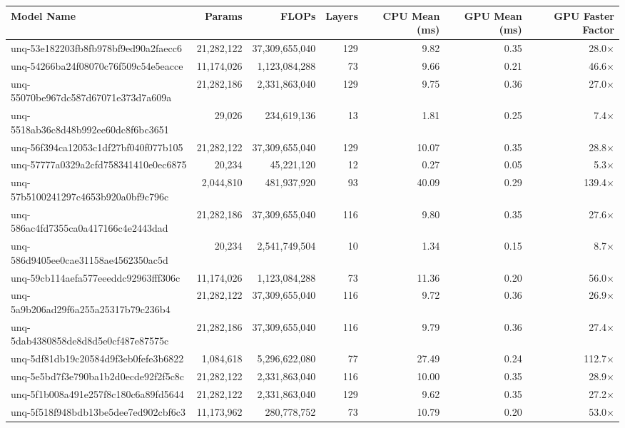 \begin{table}[h!]
\centering
\fontsize{7}{9}\selectfont
\begin{tabular}{lrrrrrr}
\toprule
\textbf{Model Name} & \textbf{Params} & \textbf{FLOPs} & \textbf{Layers} & \textbf{CPU Mean (ms)} & \textbf{GPU Mean (ms)} & \textbf{GPU Faster Factor} \\
\midrule
unq-53e182203fb8fb978bf9ed90a2faecc6 & 21,282,122 & 37,309,655,040 & 129 & 9.82 & 0.35 & 28.0$\times$ \\
unq-54266ba24f08070c76f509c54e5eacce & 11,174,026 & 1,123,084,288 & 73 & 9.66 & 0.21 & 46.6$\times$ \\
unq-55070be967dc587d67071e373d7a609a & 21,282,186 & 2,331,863,040 & 129 & 9.75 & 0.36 & 27.0$\times$ \\
unq-5518ab36c8d48b992ee60dc8f6bc3651 & 29,026 & 234,619,136 & 13 & 1.81 & 0.25 & 7.4$\times$ \\
unq-56f394ca12053c1df27bf040f077b105 & 21,282,122 & 37,309,655,040 & 129 & 10.07 & 0.35 & 28.8$\times$ \\
unq-57777a0329a2cfd758341410e0ec6875 & 20,234 & 45,221,120 & 12 & 0.27 & 0.05 & 5.3$\times$ \\
unq-57b5100241297c4653b920a0bf9c796c & 2,044,810 & 481,937,920 & 93 & 40.09 & 0.29 & 139.4$\times$ \\
unq-586ac4fd7355ca0a417166c4e2443dad & 21,282,186 & 37,309,655,040 & 116 & 9.80 & 0.35 & 27.6$\times$ \\
unq-586d9405ee0cae31158ae4562350ac5d & 20,234 & 2,541,749,504 & 10 & 1.34 & 0.15 & 8.7$\times$ \\
unq-59cb114aefa577eeeddc92963fff306c & 11,174,026 & 1,123,084,288 & 73 & 11.36 & 0.20 & 56.0$\times$ \\
unq-5a9b206ad29f6a255a25317b79c236b4 & 21,282,122 & 37,309,655,040 & 116 & 9.72 & 0.36 & 26.9$\times$ \\
unq-5dab4380858de8d8d5e0cf487e87575c & 21,282,186 & 37,309,655,040 & 116 & 9.79 & 0.36 & 27.4$\times$ \\
unq-5df81db19c20584d9f3eb0fefe3b6822 & 1,084,618 & 5,296,622,080 & 77 & 27.49 & 0.24 & 112.7$\times$ \\
unq-5e5bd7f3e790ba1b2d0ecde92f2f5c8c & 21,282,122 & 2,331,863,040 & 116 & 10.00 & 0.35 & 28.9$\times$ \\
unq-5f1b008a491e257f8c180c6a89fd5644 & 21,282,122 & 2,331,863,040 & 129 & 9.62 & 0.35 & 27.2$\times$ \\
unq-5f518f948bdb13be5dee7ed902cbf6c3 & 11,173,962 & 280,778,752 & 73 & 10.79 & 0.20 & 53.0$\times$ \\

\end{tabular}
\end{table}
